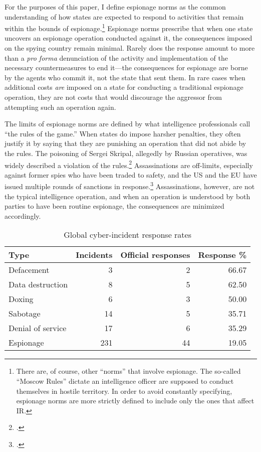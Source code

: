 \documentclass[14pt]{extarticle}
\begin{document}
For the purposes of this paper, I define espionage norms as the common understanding of how states are expected to respond to activities that remain within the bounds of espionage.\footnote{There are, of course, other \enquote{norms} that involve espionage. The so-called \enquote{Moscow Rules} dictate an intelligence officer are supposed to conduct themselves in hostile territory. In order to avoid constantly specifying, espionage norms are more strictly defined to include only the ones that affect IR.} Espionage norms prescribe that when one state uncovers an espionage operation conducted against it, the consequences imposed on the spying country remain minimal. Rarely does the response amount to more than a \emph{pro forma} denunciation of the activity and implementation of the necessary countermeasures to end it---the consequences for espionage are borne by the agents who commit it, not the state that sent them. In rare cases when additional costs \emph{are} imposed on a state for conducting a traditional espionage operation, they are not costs that would discourage the aggressor from attempting such an operation again.

The limits of espionage norms are defined by what intelligence professionals call \enquote{the rules of the game.} When states do impose harsher penalties, they often justify it by saying that they are punishing an operation that did not abide by the rules. The poisoning of Sergei Skripal, allegedly by Russian operatives, was widely described a violation of the rules.\footcite{masters_has_2018} Assassinations are off-limits, especially against former spies who have been traded to safety, and the US and the EU have issued multiple rounds of sanctions in response.\footcite{reuters_e.u._2019} Assassinations, however, are not the typical intelligence operation, and when an operation is understood by both parties to have been routine espionage, the consequences are minimized accordingly.

\begin{table}[ht]
\centering
\begin{tabular}{lrrr}
  \hline
Type & Incidents & Official responses & Response \% \\
  \hline
Defacement &   3 &   2 & 66.67 \\
  Data destruction &   8 &   5 & 62.50 \\
  Doxing &   6 &   3 & 50.00 \\
  Sabotage &  14 &   5 & 35.71 \\
  Denial of service &  17 &   6 & 35.29 \\
  Espionage & 231 &  44 & 19.05 \\
   \hline
\end{tabular}
\caption{Global cyber-incident response rates}
\label{response-pct}
\end{table}
\end{document}
